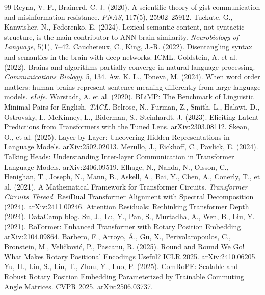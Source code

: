 \documentclass[10pt, twocolumn, a4paper]{article}
\begin{document}
\begin{thebibliography}{99}
 Reyna, V. F., Brainerd, C. J. (2020). A scientific theory of gist communication and misinformation resistance. \emph{PNAS}, 117(5), 25902--25912.
 Tuckute, G., Kanwisher, N., Fedorenko, E. (2024). Lexical-semantic content, not syntactic structure, is the main contributor to ANN-brain similarity. \emph{Neurobiology of Language}, 5(1), 7--42.
 Caucheteux, C., King, J.-R. (2022). Disentangling syntax and semantics in the brain with deep networks. ICML.
 Goldstein, A. et al. (2022). Brains and algorithms partially converge in natural language processing. \emph{Communications Biology}, 5, 134.
 Aw, K. L., Toneva, M. (2024). When word order matters: human brains represent sentence meaning differently from large language models. \emph{eLife}.
 Warstadt, A. et al. (2020). BLiMP: The Benchmark of Linguistic Minimal Pairs for English. \emph{TACL}.
 Belrose, N., Furman, Z., Smith, L., Halawi, D., Ostrovsky, I., McKinney, L., Biderman, S., Steinhardt, J. (2023). Eliciting Latent Predictions from Transformers with the Tuned Lens. arXiv:2303.08112.
 Skean, O., et al. (2025). Layer by Layer: Uncovering Hidden Representations in Language Models. arXiv:2502.02013.
 Merullo, J., Eickhoff, C., Pavlick, E. (2024). Talking Heads: Understanding Inter-layer Communication in Transformer Language Models. arXiv:2406.09519.
 Elhage, N., Nanda, N., Olsson, C., Henighan, T., Joseph, N., Mann, B., Askell, A., Bai, Y., Chen, A., Conerly, T., et al. (2021). A Mathematical Framework for Transformer Circuits. \emph{Transformer Circuits Thread}.
 ResiDual Transformer Alignment with Spectral Decomposition (2024). arXiv:2411.00246.
 Attention Residuals: Rethinking Transformer Depth (2024). DataCamp blog.
 Su, J., Lu, Y., Pan, S., Murtadha, A., Wen, B., Liu, Y. (2021). RoFormer: Enhanced Transformer with Rotary Position Embedding. arXiv:2104.09864.
 Barbero, F., Arroyo, \'A., Gu, X., Perivolaropoulos, C., Bronstein, M., Vel\-i\-\v{c}\-ko\-vi\'c, P., Pascanu, R. (2025). Round and Round We Go! What Makes Rotary Positional Encodings Useful? ICLR 2025. arXiv:2410.06205.
 Yu, H., Liu, S., Lin, T., Zhou, Y., Luo, P. (2025). ComRoPE: Scalable and Robust Rotary Position Embedding Parameterized by Trainable Commuting Angle Matrices. CVPR 2025. arXiv:2506.03737.

\end{thebibliography}
\end{document}

